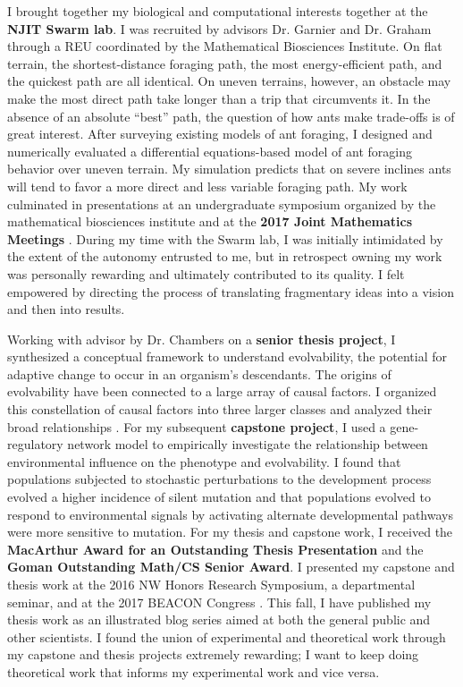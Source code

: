 I brought together my biological and computational interests together at the \textbf{NJIT Swarm lab}.
I was recruited by advisors Dr. Garnier and Dr. Graham through a REU coordinated by the Mathematical Biosciences Institute.
On flat terrain, the shortest-distance foraging path, the most energy-efficient path, and the quickest path are all identical.
On uneven terrains, however, an obstacle may make the most direct path take longer than a trip that circumvents it.
In the absence of an absolute ``best'' path, the question of how ants make trade-offs is of great interest.
After surveying existing models of ant foraging, I designed and numerically evaluated a differential equations-based model of ant foraging behavior over uneven terrain.
My simulation predicts that on severe inclines ants will tend to favor a more direct and less variable foraging path.
My work culminated in presentations at an undergraduate symposium organized by the mathematical biosciences institute and at the \textbf{2017 Joint Mathematics Meetings} \cite{mbi, jmm}.
During my time with the Swarm lab, I was initially intimidated by the extent of the autonomy entrusted to me, but in retrospect owning my work was personally rewarding and ultimately contributed to its quality.
I felt empowered by directing the process of translating fragmentary ideas into a vision and then into results.%

Working with advisor by Dr. Chambers on a \textbf{senior thesis project}, I synthesized a conceptual framework to understand evolvability, the potential for adaptive change to occur in an organism's descendants.
The origins of evolvability have been connected to a large array of causal factors.
I organized this constellation of causal factors into three larger classes and analyzed their broad relationships \cite{thesis}.
For my subsequent \textbf{capstone project}, I used a gene-regulatory network model to empirically investigate the relationship between environmental influence on the phenotype and evolvability.
I found that populations subjected to stochastic perturbations to the development process evolved a higher incidence of silent mutation and that populations evolved to respond to environmental signals by activating alternate developmental pathways were more sensitive to mutation.
For my thesis and capstone work, I received the \textbf{MacArthur Award for an Outstanding Thesis Presentation} and the \textbf{Goman Outstanding Math/CS Senior Award}.
I presented my capstone and thesis work at the 2016 NW Honors Research Symposium, a departmental seminar, and at the 2017 BEACON Congress \cite{beacon}.
This fall, I have published my thesis work as an illustrated blog series aimed at both the general public and other scientists.
I found the union of experimental and theoretical work through my capstone and thesis projects extremely rewarding;
I want to keep doing theoretical work that informs my experimental work and vice versa.
